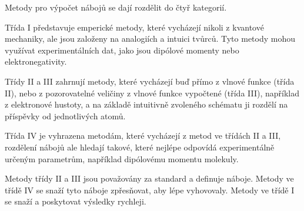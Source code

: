 \documentclass[11pt,draft,oneside]{fithesis2}
\newcommand\todo[1]{\textcolor{red}{[[#1]]}}
\renewcommand\todo[1]{}
\begin{document}
Metody pro výpočet nábojů se dají rozdělit do čtyř kategorií. \citep[s.~50]{cramer2004essentials}

Třída I představuje emperické metody, které vycházejí nikoli z kvantové mechaniky, ale jsou založeny na analogiích a intuici tvůrců. Tyto metody mohou využívat experimentálních dat, jako jsou dipólové momenty nebo elektronegativity.

\todo{definice elektonové hustoty a vzorec}

Třídy II a III zahrnují metody, které vycházejí buď přímo z vlnové funkce (třída II), nebo z pozorovatelné veličiny z vlnové funkce vypočtené (třída III), například z elektronové hustoty, a na základě intuitivně zvoleného schématu ji rozdělí na příspěvky od jednotlivých atomů.

Třída IV je vyhrazena metodám, které vycházejí z metod ve třídách II a III, rozdělení nábojů ale hledají takové, které nejlépe odpovídá experimentálně určeným parametrům, například dipólovému momentu molekuly.

Metody třídy II a III jsou považovány za standard a definuje náboje. Metody ve třídě IV se snaží tyto náboje zpřesňovat, aby lépe vyhovovaly. Metody ve třídě I se snaží a poskytovat výsledky rychleji.









%



\appendix

\end{document}
